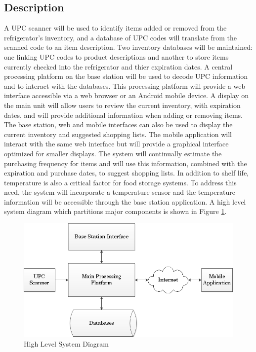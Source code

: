 \documentclass[11pt]{article} %
\begin{document}
\subsection{Description}
A UPC scanner will be used to identify items added or removed from the refrigerator's inventory, and a database of UPC codes will translate from the scanned code to an item description. Two inventory databases will be maintained: one linking UPC codes to product descriptions and another to store items currently checked into the refrigerator and thier expiration dates. A central processing platform on the base station will be used to decode UPC information and to interact with the databases. This processing platform will provide a web interface accessible via a web browser or an Android mobile device. A display on the main unit will allow users to review the current inventory, with expiration dates, and will provide additional information when adding or removing items. The base station, web and mobile interfaces can also be used to display the current inventory and suggested shopping lists. The mobile application will interact with the same web interface but will provide a graphical interface optimized for smaller displays. The system will continually estimate the purchasing frequency for items and will use this information, combined with the expiration and purchase dates, to suggest shopping lists. In addition to shelf life, temperature is also a critical factor for food storage systems. To address this need, the system will incorporate a temperature sensor and the temperature information will be accessible through the base station application.
\newline \quad \newline
A high level system diagram which partitions major components is shown in Figure \ref{fig:sysdiag}.
\begin{figure}[h]
\begin{center}
\vspace{0.5cm}
\includegraphics[scale=0.5]{../graphics/HighestLevelDiagram}
\caption{High Level System Diagram}
\label{fig:sysdiag}
\end{center}
\end{figure}
\pagebreak
\end{document}
